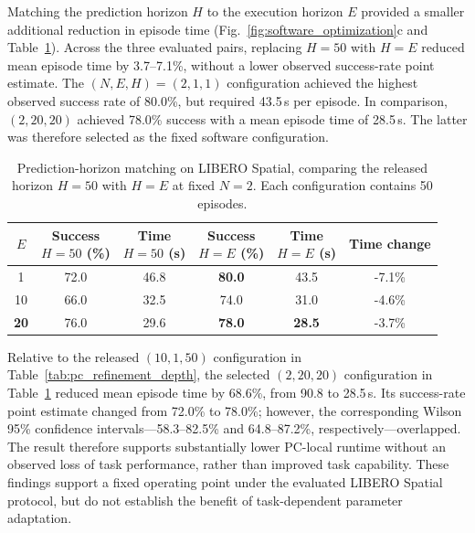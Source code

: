 Matching the prediction horizon \(H\) to the execution horizon \(E\) provided a
smaller additional reduction in episode time (Fig.~\ref{fig:software_optimization}c
and Table~\ref{tab:pc_prediction_matching}). Across the three evaluated pairs,
replacing \(H=50\) with \(H=E\) reduced mean episode time by 3.7--7.1\%, without a
lower observed success-rate point estimate. The \((N,E,H)=(2,1,1)\) configuration
achieved the highest observed success rate of 80.0\%, but required 43.5\,s per
episode. In comparison, \((2,20,20)\) achieved 78.0\% success with a mean episode
time of 28.5\,s. The latter was therefore selected as the fixed software
configuration.

\begin{table}
  \centering
  \caption{Prediction-horizon matching on LIBERO Spatial, comparing the released
  horizon \(H=50\) with \(H=E\) at fixed \(N=2\). Each configuration contains
  50 episodes.}
  \label{tab:pc_prediction_matching}
  \small
  \setlength{\tabcolsep}{4pt}
  \begin{tabular}{@{}cccccc@{}}
    \toprule
    \(E\) & \shortstack{Success\\\(H=50\) (\%)} &
    \shortstack{Time\\\(H=50\) (s)} &
    \shortstack{Success\\\(H=E\) (\%)} &
    \shortstack{Time\\\(H=E\) (s)} & Time change \\
    \midrule
    1  & 72.0 & 46.8 & \textbf{80.0} & 43.5 & -7.1\% \\
    10 & 66.0 & 32.5 & 74.0 & 31.0 & -4.6\% \\
    \textbf{20} & 76.0 & 29.6 & \textbf{78.0} & \textbf{28.5} & -3.7\% \\
    \bottomrule
  \end{tabular}
\end{table}

Relative to the released \((10,1,50)\) configuration in
Table~\ref{tab:pc_refinement_depth}, the selected \((2,20,20)\) configuration in
Table~\ref{tab:pc_prediction_matching} reduced mean episode
time by 68.6\%, from 90.8 to 28.5\,s. Its success-rate point estimate changed
from 72.0\% to 78.0\%; however, the corresponding Wilson 95\% confidence
intervals---58.3--82.5\% and 64.8--87.2\%, respectively---overlapped. The result
therefore supports substantially lower PC-local runtime without an observed loss
of task performance, rather than improved task capability. These findings support
a fixed operating point under the evaluated LIBERO Spatial protocol, but do not
establish the benefit of task-dependent parameter adaptation.

